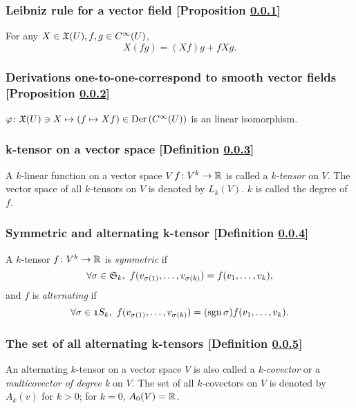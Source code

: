 \subsubsection{Leibniz rule for a vector field [Proposition \ref{leibniz-rule-for-a-vector-field}]}\label{leibniz-rule-for-a-vector-field}
For any $X \in \mathfrak{X}(U), f, g \in C^\infty(U)$,
\[
X(fg) = (Xf)g + fXg.
\]

\subsubsection{Derivations one-to-one-correspond to smooth vector fields [Proposition \ref{derivations-one-to-one-correspond-to-smooth-vector-fields}]}\label{derivations-one-to-one-correspond-to-smooth-vector-fields}
$\varphi \colon \mathfrak{X}(U) \ni X \mapsto (f \mapsto Xf) \in \mathrm{Der}\, (C^\infty(U))$ is an linear isomorphism.

\subsubsection{k-tensor on a vector space [Definition \ref{k-tensor-on-a-vector-space}]}\label{k-tensor-on-a-vector-space}
A $k$-linear function on a vector space $V$ $f \colon V^k \to \mathbb{R}$ is called a \textit{k-tensor} on $V$. The vector space of all $k$-tensors on $V$ is denoted by $L_k(V)$. $k$ is called the degree of $f$.

\subsubsection{Symmetric and alternating k-tensor [Definition \ref{symmetric-and-alternating-k-tensor}]}\label{symmetric-and-alternating-k-tensor}
A $k$-tensor $f \colon V^k \to \mathbb{R}$ is \textit{symmetric} if
\[
\forall \sigma \in \mathfrak{S}_k,\ f(v_{\sigma(1)},\dotsc, v_{\sigma(k)}) = f(v_1,\dotsc,v_k),
\]
and $f$ is \textit{alternating} if
\[
\forall \sigma \in \mathfrak{1}S_k,\ f(v_{\sigma(1)},\dotsc, v_{\sigma(k)}) = (\mathrm{sgn}\, \sigma) f(v_1,\dotsc, v_k).
\]

\subsubsection{The set of all alternating k-tensors [Definition \ref{the-set-of-all-alternating-k-tensor}]}\label{the-set-of-all-alternating-k-tensor}
An alternating $k$-tensor on a vector space $V$ is also called a \textit{k-covector} or a \textit{multicovector of degree k} on $V$. The set of all $k$-covectors on $V$ is denoted by $A_k(v)$ for $k > 0$; for $k = 0$, $A_0 (V) = \mathbb{R}$.